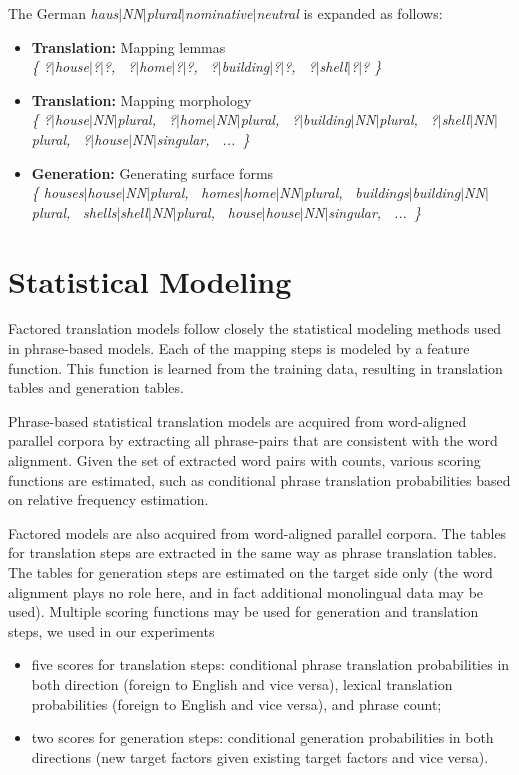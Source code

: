 \documentclass[11pt]{report}
\theoremstyle{plain}
\begin{document}
The German {\em haus$|$NN$|$plural$|$nominative$|$neutral} is expanded as follows:
\begin{itemize}
\item {\bf Translation:} Mapping lemmas\\
{\em \{ ?$|$house$|$?$|$?,$\;\;$ ?$|$home$|$?$|$?,$\;\;$ ?$|$building$|$?$|$?,$\;\;$ ?$|$shell$|$?$|$? \}}
\item {\bf Translation:} Mapping morphology\\
{\em \{ ?$|$house$|$NN$|$plural,$\;\;$ ?$|$home$|$NN$|$plural,$\;\;$ ?$|$building$|$NN$|$plural,$\;\;$ ?$|$shell$|$NN$|$plural,$\;\;$ ?$|$house$|$NN$|$singular,$\;\;$ ...~\}}
\item {\bf Generation:} Generating surface forms\\
{\em \{ houses$|$house$|$NN$|$plural,$\;\;$ homes$|$home$|$NN$|$plural,$\;\;$ buildings$|$building$|$NN$|$plural,$\;\;$ shells$|$shell$|$NN$|$plural,$\;\;$ house$|$house$|$NN$|$singular,$\;\;$ ...~\}}
\end{itemize}

\section{Statistical Modeling}
Factored translation models follow closely the statistical modeling methods used in phrase-based models. Each of the mapping steps is modeled by a feature function. This function is learned from the training data, resulting in translation tables and generation tables.

Phrase-based statistical translation models are acquired from word-aligned parallel corpora by extracting all phrase-pairs that are consistent with the word alignment. Given the set of extracted word pairs with counts, various scoring functions are estimated, such as conditional phrase translation probabilities based on relative frequency estimation.

Factored models are also acquired from word-aligned parallel corpora. The tables for translation steps are extracted in the same way as phrase translation tables. The tables for generation steps are estimated on the target side only (the word alignment plays no role here, and in fact additional monolingual data may be used). Multiple scoring functions may be used for generation and translation steps, we used in our experiments
\begin{itemize}
\item five scores for translation steps: conditional phrase translation probabilities in both direction (foreign to English and vice versa), lexical translation probabilities (foreign to English and vice versa), and phrase count;
\item two scores for generation steps: conditional generation probabilities in both directions (new target factors given existing target factors and vice versa).
\end{itemize}
\end{document}
